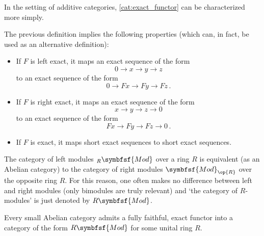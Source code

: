     In the setting of additive categories, \cref{cat:exact_functor} can be characterized more simply.
    \begin{result}
        The previous definition implies the following properties (which can, in fact, be used as an alternative definition):
        \begin{itemize}
            \item If $F$ is left exact, it maps an exact sequence of the form \[0\longrightarrow x\longrightarrow y\longrightarrow z\]
            to an exact sequence of the form \[0\longrightarrow Fx\longrightarrow Fy\longrightarrow Fz\,.\]
            \item If $F$ is right exact, it maps an exact sequence of the form \[x\longrightarrow y\longrightarrow z\longrightarrow 0\]
            to an exact sequence of the form \[Fx\longrightarrow Fy\longrightarrow Fz\longrightarrow 0\,.\]
            \item If $F$ is exact, it maps short exact sequences to short exact sequences.
        \end{itemize}
    \end{result}

    \begin{notation}
        The category of left modules ${}_R\symbfsf{Mod}$ over a ring $R$ is equivalent (as an Abelian category) to the category of right modules $\symbfsf{Mod}_{\op{R}}$ over the opposite ring $R$. For this reason, one often makes no difference between left and right modules (only bimodules are truly relevant) and `the category of $R$-modules' is just denoted by $R\symbfsf{Mod}$.
    \end{notation}

    \begin{theorem}\label{cat:freyd_mitchell}
        Every small Abelian category admits a fully faithful, exact functor into a category of the form $R\symbfsf{Mod}$ for some unital ring $R$.
    \end{theorem}


